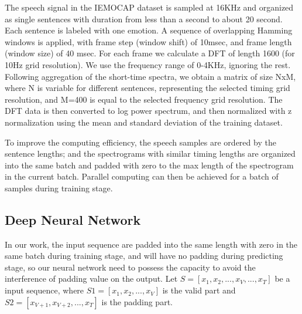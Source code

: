 \documentclass[a4paper]{article}
\begin{document}
The speech signal in the IEMOCAP dataset is sampled at 16KHz and organized as single sentences with duration from less than a second to about 20 second. Each sentence is labeled with one emotion. A sequence of overlapping Hamming windows is applied, with frame step (window shift) of 10msec, and frame length (window size) of 40 msec. For each frame we calculate a DFT of length 1600 (for 10Hz grid resolution). We use the frequency range of 0-4KHz, ignoring the rest. Following aggregation of the short-time spectra, we obtain a matrix of size NxM, where N is variable for different sentences, representing the selected timing grid resolution,  and M=400 is equal to the selected frequency grid resolution. The DFT data is then converted to log power spectrum, and then normalized with z normalization using the mean and standard deviation of the training dataset.

To improve the computing efficiency, the speech samples are ordered by the sentence lengths; and the spectrograms with similar timing lengths are organized into the same batch and padded with zero to the max length of the spectrogram in the current batch.  Parallel computing can then be achieved for a batch of samples during training stage.

\subsection{Deep Neural Network}
\label{ssec:deep_neural_network}

In our work, the input sequence are padded into the same length with zero in the same batch during training stage, and will have no padding during predicting stage, so our neural network need to possess the capacity to avoid the interference of padding value on the output.  Let $S=[x_1, x_2, ..., x_V, ..., x_T]$ be a input sequence, where $S1=[x_1, x_2, ..., x_V]$ is the valid part and $S2=[x_{V+1}, x_{V+2}, ..., x_T]$ is the padding part.
\end{document}
